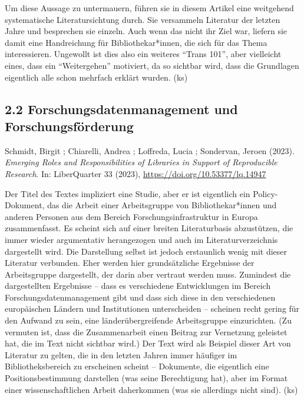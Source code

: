 \documentclass[a4paper,
fontsize=11pt,
oneside,
numbers=noperiodatend,
parskip=half-,
bibliography=totoc,
final
]{scrartcl}
\begin{document}
Um diese Aussage zu untermauern, führen sie in diesem Artikel eine
weitgehend systematische Literatursichtung durch. Sie versammeln
Literatur der letzten Jahre und besprechen sie einzeln. Auch wenn das
nicht ihr Ziel war, liefern sie damit eine Handreichung für
Bibliothekar*innen, die sich für das Thema interessieren. Ungewollt ist
dies also ein weiteres \enquote{Trans 101}, aber vielleicht eines, dass
ein \enquote{Weitergehen} motiviert, da so sichtbar wird, dass die
Grundlagen eigentlich alle schon mehrfach erklärt wurden. (ks)

\hypertarget{forschungsdatenmanagement-und-forschungsfuxf6rderung}{%
\subsection{2.2 Forschungsdatenmanagement und
Forschungsförderung}\label{forschungsdatenmanagement-und-forschungsfuxf6rderung}}

Schmidt, Birgit ; Chiarelli, Andrea ; Loffreda, Lucia ; Sondervan,
Jeroen (2023). \emph{Emerging Roles and Responsibilities of Libraries in
Support of Reproducible Research}. In: LiberQuarter 33 (2023),
\url{https://doi.org/10.53377/lq.14947}

Der Titel des Textes impliziert eine Studie, aber er ist eigentlich ein
Policy-Dokument, das die Arbeit einer Arbeitsgruppe von
Bibliothekar*innen und anderen Personen aus dem Bereich
Forschungsinfrastruktur in Europa zusammenfasst. Es scheint sich auf
einer breiten Literaturbasis abzustützen, die immer wieder argumentativ
herangezogen und auch im Literaturverzeichnis dargestellt wird. Die
Darstellung selbst ist jedoch erstaunlich wenig mit dieser Literatur
verbunden. Eher werden hier grundsätzliche Ergebnisse der Arbeitsgruppe
dargestellt, der darin aber vertraut werden muss. Zumindest die
dargestellten Ergebnisse -- dass es verschiedene Entwicklungen im
Bereich Forschungsdatenmanagement gibt und dass sich diese in den
verschiedenen europäischen Ländern und Institutionen unterscheiden --
scheinen recht gering für den Aufwand zu sein, eine länderübergreifende
Arbeitsgruppe einzurichten. (Zu vermuten ist, dass die Zusammenarbeit
einen Beitrag zur Vernetzung geleistet hat, die im Text nicht sichtbar
wird.) Der Text wird als Beispiel dieser Art von Literatur zu gelten,
die in den letzten Jahren immer häufiger im Bibliotheksbereich zu
erscheinen scheint -- Dokumente, die eigentlich eine Positionsbestimmung
darstellen (was seine Berechtigung hat), aber im Format einer
wissenschaftlichen Arbeit daherkommen (was sie allerdings nicht sind).
(ks)
\end{document}

